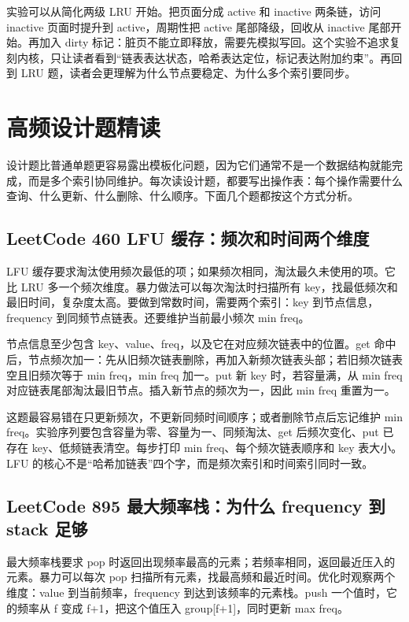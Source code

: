 实验可以从简化两级 LRU 开始。把页面分成 active 和 inactive 两条链，访问 inactive 页面时提升到 active，周期性把 active 尾部降级，回收从 inactive 尾部开始。再加入 dirty 标记：脏页不能立即释放，需要先模拟写回。这个实验不追求复刻内核，只让读者看到“链表表达状态，哈希表达定位，标记表达附加约束”。再回到 LRU 题，读者会更理解为什么节点要稳定、为什么多个索引要同步。

\section{高频设计题精读}

设计题比普通单题更容易露出模板化问题，因为它们通常不是一个数据结构就能完成，而是多个索引协同维护。每次读设计题，都要写出操作表：每个操作需要什么查询、什么更新、什么删除、什么顺序。下面几个题都按这个方式分析。

\subsection{LeetCode 460 LFU 缓存：频次和时间两个维度}

LFU 缓存要求淘汰使用频次最低的项；如果频次相同，淘汰最久未使用的项。它比 LRU 多一个频次维度。暴力做法可以每次淘汰时扫描所有 key，找最低频次和最旧时间，复杂度太高。要做到常数时间，需要两个索引：key 到节点信息，frequency 到同频节点链表。还要维护当前最小频次 min freq。

节点信息至少包含 key、value、freq，以及它在对应频次链表中的位置。get 命中后，节点频次加一：先从旧频次链表删除，再加入新频次链表头部；若旧频次链表空且旧频次等于 min freq，min freq 加一。put 新 key 时，若容量满，从 min freq 对应链表尾部淘汰最旧节点。插入新节点的频次为一，因此 min freq 重置为一。

这题最容易错在只更新频次，不更新同频时间顺序；或者删除节点后忘记维护 min freq。实验序列要包含容量为零、容量为一、同频淘汰、get 后频次变化、put 已存在 key、低频链表清空。每步打印 min freq、每个频次链表顺序和 key 表大小。LFU 的核心不是“哈希加链表”四个字，而是频次索引和时间索引同时一致。

\subsection{LeetCode 895 最大频率栈：为什么 frequency 到 stack 足够}

最大频率栈要求 pop 时返回出现频率最高的元素；若频率相同，返回最近压入的元素。暴力可以每次 pop 扫描所有元素，找最高频和最近时间。优化时观察两个维度：value 到当前频率，frequency 到达到该频率的元素栈。push 一个值时，它的频率从 f 变成 f+1，把这个值压入 group[f+1]，同时更新 max freq。

